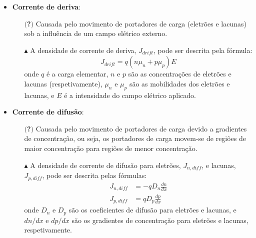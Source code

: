 \begin{itemize}[leftmargin=*]
    \item \textbf{Corrente de deriva}:
    \begin{itemize}
        \item[$($\textbf{?}$)$] Causada pelo movimento de portadores de carga (eletrões e lacunas) sob a influência de um campo elétrico externo.
        \item[$\blacktriangle$] A densidade de corrente de deriva, $J_{\textit{drift}}$, pode ser descrita pela fórmula:
        \begin{equation*}
            J_{\textit{drift}} = q(n \mu_n + p \mu_p)E
        \end{equation*}
        onde $q$ é a carga elementar, $n$ e $p$ são as concentrações de eletrões e lacunas (respetivamente), $\mu_n$ e $\mu_p$ são as mobilidades dos eletrões e lacunas, e $E$ é a intensidade do campo elétrico aplicado.
    \end{itemize}

    \item \textbf{Corrente de difusão}:
    \begin{itemize}
        \item[$($\textbf{?}$)$] Causada pelo movimento de portadores de carga devido a gradientes de concentração, ou seja, os portadores de carga movem-se de regiões de maior concentração para regiões de menor concentração.
        \item[$\blacktriangle$] A densidade de corrente de difusão para eletrões, $J_{n, \textit{diff}}$, e lacunas, $J_{p, \textit{diff}}$, pode ser descrita pelas fórmulas:
            \begin{align*}
                J_{n, \textit{diff}} &= -qD_n\frac{dn}{dx} \\
                J_{p, \textit{diff}} &= qD_p\frac{dp}{dx}
            \end{align*}
        onde $D_n$ e $D_p$ são os coeficientes de difusão para eletrões e lacunas, e $dn/dx$ e $dp/dx$ são os gradientes de concentração para eletrões e lacunas, respetivamente.
    \end{itemize}


\end{itemize}
